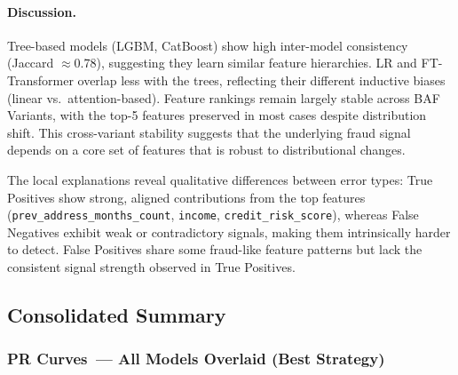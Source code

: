 \paragraph{Discussion.}
Tree-based models (LGBM, CatBoost) show high inter-model consistency
(Jaccard $\approx$0.78), suggesting they learn similar feature hierarchies.
LR and FT-Transformer overlap less with the trees,
reflecting their different inductive biases (linear vs.\ attention-based).
Feature rankings remain largely stable across BAF Variants,
with the top-5 features preserved in most cases despite distribution shift.
This cross-variant stability suggests that the underlying fraud signal
depends on a core set of features that is robust to distributional changes.

The local explanations reveal qualitative differences between error types:
True Positives show strong, aligned contributions from the top features
(\texttt{prev\_address\_months\_count}, \texttt{income}, \texttt{credit\_risk\_score}),
whereas False Negatives exhibit weak or contradictory signals,
making them intrinsically harder to detect.
False Positives share some fraud-like feature patterns but lack
the consistent signal strength observed in True Positives.



\subsection{Consolidated Summary}
\label{sec:consolidated}

\subsubsection{PR Curves~--- All Models Overlaid (Best Strategy)}


